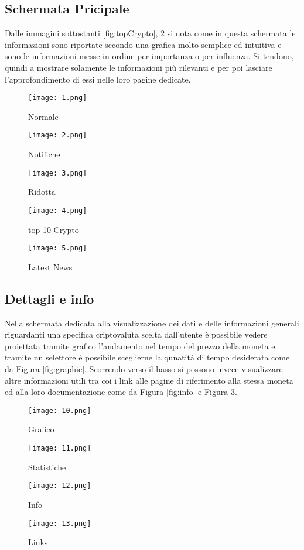 \documentclass{article}
\begin{document}
\subsection{Schermata Pricipale}
Dalle immagini sottostanti \ref{fig:topCrypto}, \ref{fig:topNews} si nota come in questa schermata le informazioni sono riportate secondo una grafica molto semplice ed intuitiva e sono le informazioni messe in ordine per importanza o per influenza.
Si tendono, quindi a mostrare solamente le informazioni più rilevanti e per poi lasciare l'approfondimento di essi nelle loro pagine dedicate.


\begin{figure}[!htb]
  \texttt{[image: 1.png]}
  \caption{Normale}\label{fig:normale}
\endminipage\hfill
{}
  \texttt{[image: 2.png]}
  \caption{Notifiche}\label{fig:notifiche}
\endminipage\hfill
{}%
  \texttt{[image: 3.png]}
  \caption{Ridotta}\label{fig:ridotta}
\endminipage
\end{figure}

\begin{figure}[!htb]
\minipage{\textwidth}
    \centering
  \texttt{[image: 4.png]}
  \caption{top 10 Crypto}\label{fig:topCrypto}
\endminipage\hfill

\minipage{\textwidth}
    \centering
  \texttt{[image: 5.png]}
  \caption{Latest News}\label{fig:topNews}
\endminipage\hfill
\end{figure}
\clearpage

\subsection{Dettagli e info}
Nella schermata dedicata alla visualizzazione dei dati e delle informazioni generali riguardanti una specifica criptovaluta scelta dall'utente è possibile vedere proiettata tramite grafico l'andamento nel tempo del prezzo della moneta e tramite un selettore è possibile sceglierne la qunatità di tempo desiderata come da Figura \ref{fig:graphic}. 
Scorrendo verso il basso si possono invece visualizzare altre informazioni utili  tra coi i link alle pagine di riferimento alla stessa moneta ed alla loro documentazione come da Figura \ref{fig:info} e Figura \ref{fig:links}.

\begin{figure}[!htb]
    \centering
  \texttt{[image: 10.png]}
  \caption{Grafico}\label{fig:graphic}
\endminipage\hfill
{}
    \centering
  \texttt{[image: 11.png]}
  \caption{Statistiche}\label{fig:stats}
\endminipage\hfill
{}
    \centering
  \texttt{[image: 12.png]}
  \caption{Info}\label{fig:info}
\endminipage\hfill
{}
    \centering
  \texttt{[image: 13.png]}
  \caption{Links}\label{fig:links}
\endminipage\hfill
\end{figure}
\clearpage
\end{document}
